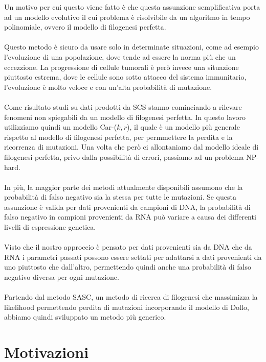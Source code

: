 \documentclass[12pt]{report}
\begin{document}
  Un motivo per cui questo viene fatto è che questa assunzione semplificativa porta ad un modello evolutivo il cui problema è risolvibile da un algoritmo in tempo polinomiale, ovvero il modello di filogenesi perfetta\cite{gusfield1991efficient}.\\\\
  Questo metodo è sicuro da usare solo in determinate situazioni, come ad esempio l'evoluzione di una popolazione, dove tende ad essere la norma più che un eccezzione\cite{10.1093/genetics/61.4.893}.
  La progressione di cellule tumorali è però invece una situazione piuttosto estrema, dove le cellule sono sotto attacco del sistema immunitario, l'evoluzione è molto veloce e con un'alta probabilità di mutazione.\\\\
  Come risultato studi su dati prodotti da SCS stanno cominciando a rilevare fenomeni non spiegabili da un modello di filogenesi perfetta\cite{Kuipers2022.01.28.478229}\cite{Brown2017}.
  In questo lavoro utilizziamo quindi un modello Car-($k, r$), il quale è un modello più generale rispetto al modello di filogenesi perfetta, per permmettere la perdita e la ricorrenza di mutazioni.
  Una volta che però ci allontaniamo dal modello ideale di filogenesi perfetta\cite{gusfield1991efficient}, privo dalla possibilità di errori, passiamo ad un problema NP-hard.\\\\
  In più, la maggior parte dei metodi attualmente disponibili assumono che la probabilità di falso negativo sia la stessa per tutte le mutazioni.
  Se questa assunzione è valida per dati provenienti da campioni di DNA, la probabilità di falso negativo in campioni provenienti da RNA può variare a causa dei differenti livelli di espressione genetica.\\\\
  Visto che il nostro approccio è pensato per dati provenienti sia da DNA che da RNA i parametri passati possono essere settati per adattarsi a dati provenienti da uno piuttosto che dall'altro, permettendo quindi anche una probabilità di falso negativo diversa per ogni mutazione.\\\\
  Partendo dal metodo SASC\cite{10.1093/bioinformatics/btaa722}, un metodo di ricerca di filogenesi che massimizza la likelihood permettendo perdita di mutazioni incorporando il modello di Dollo\cite{10.2307/2412867}, abbiamo quindi sviluppato un metodo più generico.

  \section{Motivazioni}
\end{document}
